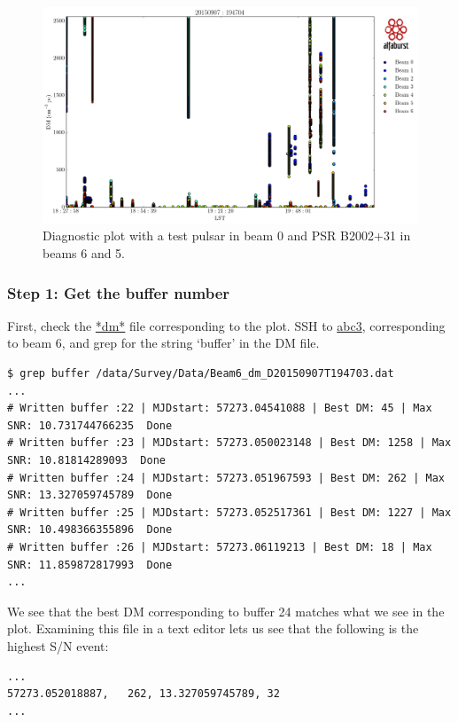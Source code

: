 \documentclass{article}
\begin{document}
\begin{figure}[h]
\includegraphics[width=\textwidth]{AllBeams_D20150907T194704.png}
\caption{Diagnostic plot with a test pulsar in beam 0 and PSR B2002+31 in beams
    6 and 5.\label{fig_dmvst}}
\end{figure}

\subsubsection*{Step 1: Get the buffer number}

First, check the \url{*dm*} file corresponding to the plot. SSH to \url{abc3},
corresponding to beam 6, and grep for the string `buffer' in the DM file.

\small{
\begin{verbatim}
$ grep buffer /data/Survey/Data/Beam6_dm_D20150907T194703.dat
...
# Written buffer :22 | MJDstart: 57273.04541088 | Best DM: 45 | Max SNR: 10.731744766235  Done
# Written buffer :23 | MJDstart: 57273.050023148 | Best DM: 1258 | Max SNR: 10.81814289093  Done
# Written buffer :24 | MJDstart: 57273.051967593 | Best DM: 262 | Max SNR: 13.327059745789  Done
# Written buffer :25 | MJDstart: 57273.052517361 | Best DM: 1227 | Max SNR: 10.498366355896  Done
# Written buffer :26 | MJDstart: 57273.06119213 | Best DM: 18 | Max SNR: 11.859872817993  Done
...
\end{verbatim}
}

We see that the best DM corresponding to buffer 24 matches what we see in the
plot. Examining this file in a text editor lets us see that the following is
the highest S/N event:

\small{
\begin{verbatim}
...
57273.052018887,   262, 13.327059745789, 32
...
\end{verbatim}
}
\end{document}
